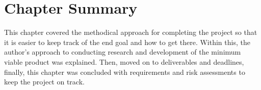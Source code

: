\section{Chapter Summary}

This chapter covered the methodical approach for completing the project so that it is easier to keep track of the end goal and how to get there. Within this, the author’s approach to conducting research and development of the minimum viable product was explained. Then, moved on to deliverables and deadlines, finally, this chapter was concluded with requirements and risk assessments to keep the project on track.